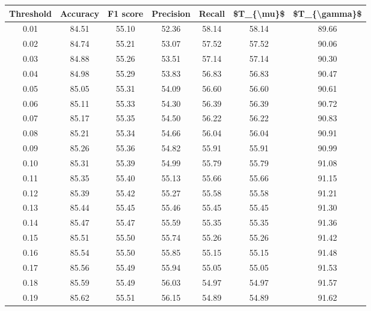 \begin{tabular}{|c|c|c|c|c|c|c|}
\hline
 Threshold &  Accuracy &  F1 score &  Precision &  Recall &  \$T\_\{\textbackslash mu\}\$ &  \$T\_\{\textbackslash gamma\}\$ \\
\hline
      0.01 &     84.51 &     55.10 &      52.36 &   58.14 &      58.14 &         89.66 \\
      0.02 &     84.74 &     55.21 &      53.07 &   57.52 &      57.52 &         90.06 \\
      0.03 &     84.88 &     55.26 &      53.51 &   57.14 &      57.14 &         90.30 \\
      0.04 &     84.98 &     55.29 &      53.83 &   56.83 &      56.83 &         90.47 \\
      0.05 &     85.05 &     55.31 &      54.09 &   56.60 &      56.60 &         90.61 \\
      0.06 &     85.11 &     55.33 &      54.30 &   56.39 &      56.39 &         90.72 \\
      0.07 &     85.17 &     55.35 &      54.50 &   56.22 &      56.22 &         90.83 \\
      0.08 &     85.21 &     55.34 &      54.66 &   56.04 &      56.04 &         90.91 \\
      0.09 &     85.26 &     55.36 &      54.82 &   55.91 &      55.91 &         90.99 \\
      0.10 &     85.31 &     55.39 &      54.99 &   55.79 &      55.79 &         91.08 \\
      0.11 &     85.35 &     55.40 &      55.13 &   55.66 &      55.66 &         91.15 \\
      0.12 &     85.39 &     55.42 &      55.27 &   55.58 &      55.58 &         91.21 \\
      0.13 &     85.44 &     55.45 &      55.46 &   55.45 &      55.45 &         91.30 \\
      0.14 &     85.47 &     55.47 &      55.59 &   55.35 &      55.35 &         91.36 \\
      0.15 &     85.51 &     55.50 &      55.74 &   55.26 &      55.26 &         91.42 \\
      0.16 &     85.54 &     55.50 &      55.85 &   55.15 &      55.15 &         91.48 \\
      0.17 &     85.56 &     55.49 &      55.94 &   55.05 &      55.05 &         91.53 \\
      0.18 &     85.59 &     55.49 &      56.03 &   54.97 &      54.97 &         91.57 \\
      0.19 &     85.62 &     55.51 &      56.15 &   54.89 &      54.89 &         91.62 \\

\end{tabular}
